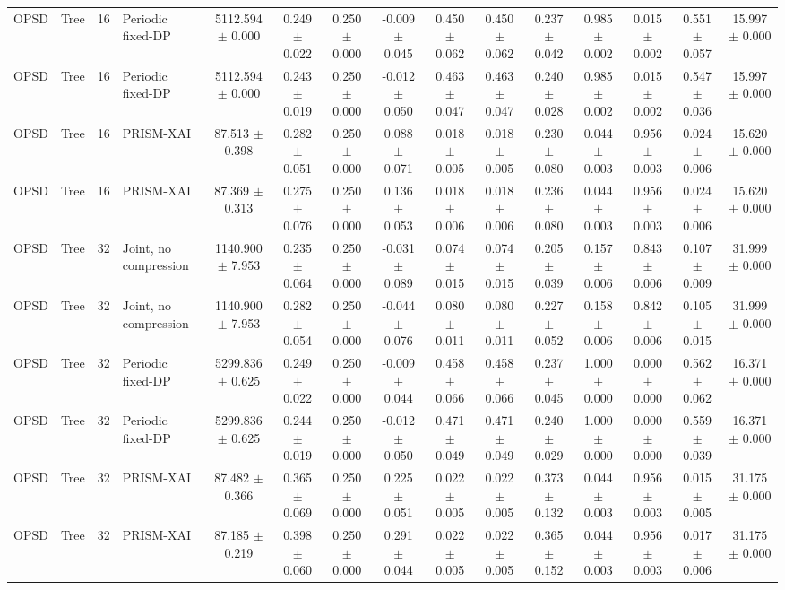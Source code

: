 \begin{tabular}{llllccccccccccc}
OPSD & Tree & 16 & Periodic fixed-DP & 5112.594 $\pm$ 0.000 & 0.249 $\pm$ 0.022 & 0.250 $\pm$ 0.000 & -0.009 $\pm$ 0.045 & 0.450 $\pm$ 0.062 & 0.450 $\pm$ 0.062 & 0.237 $\pm$ 0.042 & 0.985 $\pm$ 0.002 & 0.015 $\pm$ 0.002 & 0.551 $\pm$ 0.057 & 15.997 $\pm$ 0.000 \\
OPSD & Tree & 16 & Periodic fixed-DP & 5112.594 $\pm$ 0.000 & 0.243 $\pm$ 0.019 & 0.250 $\pm$ 0.000 & -0.012 $\pm$ 0.050 & 0.463 $\pm$ 0.047 & 0.463 $\pm$ 0.047 & 0.240 $\pm$ 0.028 & 0.985 $\pm$ 0.002 & 0.015 $\pm$ 0.002 & 0.547 $\pm$ 0.036 & 15.997 $\pm$ 0.000 \\
OPSD & Tree & 16 & PRISM-XAI & 87.513 $\pm$ 0.398 & 0.282 $\pm$ 0.051 & 0.250 $\pm$ 0.000 & 0.088 $\pm$ 0.071 & 0.018 $\pm$ 0.005 & 0.018 $\pm$ 0.005 & 0.230 $\pm$ 0.080 & 0.044 $\pm$ 0.003 & 0.956 $\pm$ 0.003 & 0.024 $\pm$ 0.006 & 15.620 $\pm$ 0.000 \\
OPSD & Tree & 16 & PRISM-XAI & 87.369 $\pm$ 0.313 & 0.275 $\pm$ 0.076 & 0.250 $\pm$ 0.000 & 0.136 $\pm$ 0.053 & 0.018 $\pm$ 0.006 & 0.018 $\pm$ 0.006 & 0.236 $\pm$ 0.080 & 0.044 $\pm$ 0.003 & 0.956 $\pm$ 0.003 & 0.024 $\pm$ 0.006 & 15.620 $\pm$ 0.000 \\
OPSD & Tree & 32 & Joint, no compression & 1140.900 $\pm$ 7.953 & 0.235 $\pm$ 0.064 & 0.250 $\pm$ 0.000 & -0.031 $\pm$ 0.089 & 0.074 $\pm$ 0.015 & 0.074 $\pm$ 0.015 & 0.205 $\pm$ 0.039 & 0.157 $\pm$ 0.006 & 0.843 $\pm$ 0.006 & 0.107 $\pm$ 0.009 & 31.999 $\pm$ 0.000 \\
OPSD & Tree & 32 & Joint, no compression & 1140.900 $\pm$ 7.953 & 0.282 $\pm$ 0.054 & 0.250 $\pm$ 0.000 & -0.044 $\pm$ 0.076 & 0.080 $\pm$ 0.011 & 0.080 $\pm$ 0.011 & 0.227 $\pm$ 0.052 & 0.158 $\pm$ 0.006 & 0.842 $\pm$ 0.006 & 0.105 $\pm$ 0.015 & 31.999 $\pm$ 0.000 \\
OPSD & Tree & 32 & Periodic fixed-DP & 5299.836 $\pm$ 0.625 & 0.249 $\pm$ 0.022 & 0.250 $\pm$ 0.000 & -0.009 $\pm$ 0.044 & 0.458 $\pm$ 0.066 & 0.458 $\pm$ 0.066 & 0.237 $\pm$ 0.045 & 1.000 $\pm$ 0.000 & 0.000 $\pm$ 0.000 & 0.562 $\pm$ 0.062 & 16.371 $\pm$ 0.000 \\
OPSD & Tree & 32 & Periodic fixed-DP & 5299.836 $\pm$ 0.625 & 0.244 $\pm$ 0.019 & 0.250 $\pm$ 0.000 & -0.012 $\pm$ 0.050 & 0.471 $\pm$ 0.049 & 0.471 $\pm$ 0.049 & 0.240 $\pm$ 0.029 & 1.000 $\pm$ 0.000 & 0.000 $\pm$ 0.000 & 0.559 $\pm$ 0.039 & 16.371 $\pm$ 0.000 \\
OPSD & Tree & 32 & PRISM-XAI & 87.482 $\pm$ 0.366 & 0.365 $\pm$ 0.069 & 0.250 $\pm$ 0.000 & 0.225 $\pm$ 0.051 & 0.022 $\pm$ 0.005 & 0.022 $\pm$ 0.005 & 0.373 $\pm$ 0.132 & 0.044 $\pm$ 0.003 & 0.956 $\pm$ 0.003 & 0.015 $\pm$ 0.005 & 31.175 $\pm$ 0.000 \\
OPSD & Tree & 32 & PRISM-XAI & 87.185 $\pm$ 0.219 & 0.398 $\pm$ 0.060 & 0.250 $\pm$ 0.000 & 0.291 $\pm$ 0.044 & 0.022 $\pm$ 0.005 & 0.022 $\pm$ 0.005 & 0.365 $\pm$ 0.152 & 0.044 $\pm$ 0.003 & 0.956 $\pm$ 0.003 & 0.017 $\pm$ 0.006 & 31.175 $\pm$ 0.000 \\
\bottomrule
\end{tabular}

